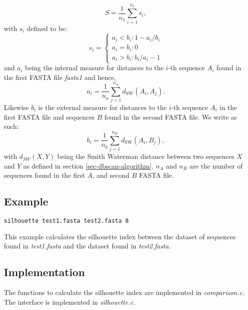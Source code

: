 \begin{equation}
  S=\frac{1}{n_1}\sum_{i=1}^{n_{1}} s_{i},
\end{equation}
with $s_i$ defined to be:
\begin{equation}
  s_i=\left\{
  \begin{array}{l}
    a_i < b_i : 1-a_i/b_i \\
    a_i = b_i : 0 \\
    a_i > b_i : b_i/a_i-1
  \end{array} \right.
\end{equation}
and $a_i$ being the internal measure for distances to the $i$-th
sequence $A_i$ found in the first FASTA file \emph{fasta1} and hence,
\begin{equation}
  a_i = \frac{1}{n_a}\sum_{j=1}^{n_A}d_{\mathrm{SW}}(A_i,A_j).
\end{equation}
Likewise $b_i$ is the external measure for distances to the $i$-th
sequence $A_i$ in the first FASTA file and sequences $B$ found in the
second FASTA file. We write as such:
\begin{equation}
  b_i = \frac{1}{n_b}\sum_{j=1}^{n_B}d_{\mathrm{SW}}(A_i,B_j),
\end{equation}
with $d_{SW}(X,Y)$ being the Smith Waterman distance between two
sequences $X$ and $Y$ as defined in section
\ref{sec-dbscan-algorithm}. $n_A$ and $n_B$ are the number of
sequences found in the first $A$, and second $B$ FASTA file. 

\subsection{Example}
\begin{lstlisting}
silhouette test1.fasta test2.fasta 8
\end{lstlisting}
This example calculates the silhouette index between the dataset of
sequences found  in \emph{test1.fasta} and the dataset found in
\emph{test2.fasta}.

\subsection{Implementation}
The functions to calculate the silhouette index are implemented in
\emph{comparison.c}. The interface is implemented in
\emph{silhouette.c}.


